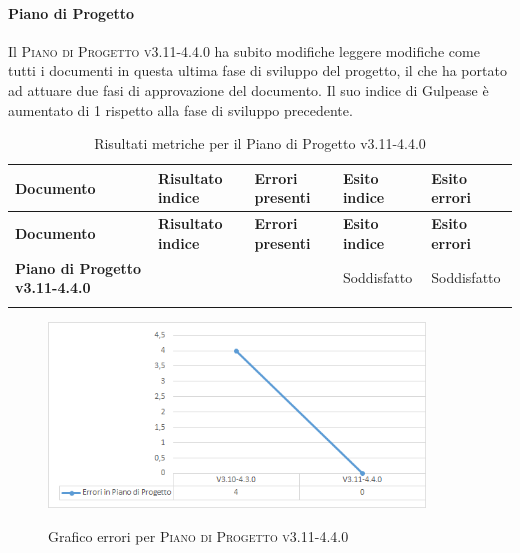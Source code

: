 \paragraph{Piano di Progetto}
\label{sub:piano_di_progetto}
Il \textsc{Piano di Progetto v3.11-4.4.0} ha subito modifiche leggere modifiche come tutti i documenti in questa ultima fase di sviluppo del progetto, il che ha portato ad attuare due fasi di approvazione del documento.
Il suo indice di Gulpease è aumentato di 1 rispetto alla fase di sviluppo precedente.

\renewcommand{\arraystretch}{2} %
\begin{longtable}[H]{>{\centering\bfseries}m{6cm} >{\centering}m{2cm} >{\centering}m{2.5cm} >{\centering}m{2.5cm} >{\centering\arraybackslash}m{2.5cm}}  
  \rowcolor{lightgray}
  {\textbf{Documento}} & {\textbf{Risultato indice}} & {\textbf{Errori presenti}} & {\textbf{Esito indice}} & {\textbf{Esito errori}}  \\
  \endfirsthead%
  \rowcolor{lightgray}
  {\textbf{Documento}} & {\textbf{Risultato indice}} & {\textbf{Errori presenti}} & {\textbf{Esito indice}} & {\textbf{Esito errori}}  \\
  \endhead%
  \textbf{Piano di Progetto v3.11-4.4.0} & 73               & 0               & Soddisfatto & Soddisfatto \\
  \caption{Risultati metriche per il Piano di Progetto v3.11-4.4.0}
  \label{tab:my-table}
\end{longtable}

\begin{figure}[H]
  \centering
  \includegraphics[width=10cm]{img/erroriPdPv3.11-4.4.0.png}
  \label{fig:errori_pdq}
  \caption{Grafico errori per \textsc{Piano di Progetto v3.11-4.4.0}}
\end{figure}


